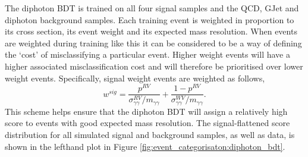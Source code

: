 The diphoton BDT is trained on all four signal samples and the QCD, GJet and diphoton background samples. 
Each training event is weighted in proportion to its cross section, its event weight and its expected mass resolution. 
When events are weighted during training like this it can be considered to be a way of defining the `cost' of misclassifying a particular event. Higher weight events will have a higher associated misclassification cost and will therefore be prioritised over lower weight events. 
Specifically, signal weight events are weighted as follows,
\begin{equation}
    w^{sig} = \frac{p^{RV}}{\sigma^{RV}_{\gamma\gamma}/m_{\gamma\gamma}} + \frac{1-p^{RV}}{\sigma^{WV}_{\gamma\gamma}/m_{\gamma\gamma}}.
\end{equation}
This scheme helps ensure that the diphoton BDT will assign a relatively high score to events with good expected mass resolution. 
The signal-flattened score distribution for all simulated signal and background samples, as well as data, is shown in the lefthand plot in Figure \ref{fig:event_categorisaton:diphoton_bdt}. 

